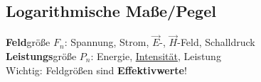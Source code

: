 


    \subsection{Logarithmische Maße/Pegel}
    \textbf{Feld}größe $F_n$: Spannung, Strom, $\vec{E}$-, $\vec{H}$-Feld, Schalldruck \\
    \textbf{Leistungs}größe $P_n$: Energie, \underline{Intensität}, Leistung\\
	Wichtig: Feldgrößen sind \textbf{Effektivwerte}!
